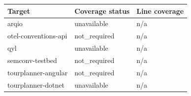 \begin{tabular}{lll}
\hline
Target & Coverage status & Line coverage \\
\hline
arqio & unavailable & n/a \\
otel-conventions-api & not\_required & n/a \\
qyl & unavailable & n/a \\
semconv-testbed & not\_required & n/a \\
tourplanner-angular & not\_required & n/a \\
tourplanner-dotnet & unavailable & n/a \\
\hline
\end{tabular}
